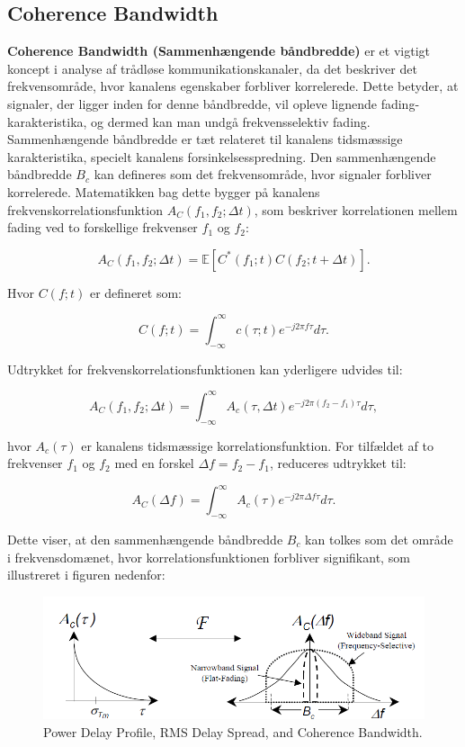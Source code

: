\documentclass[a4paper,12pt]{book}
\begin{document}
	\subsection{Coherence Bandwidth}
	\textbf{Coherence Bandwidth (Sammenhængende båndbredde)} er et vigtigt koncept i analyse af trådløse kommunikationskanaler, da det beskriver det frekvensområde, hvor kanalens egenskaber forbliver korrelerede. Dette betyder, at signaler, der ligger inden for denne båndbredde, vil opleve lignende fading-karakteristika, og dermed kan man undgå frekvensselektiv fading.
	\newline\newline
	Sammenhængende båndbredde er tæt relateret til kanalens tidsmæssige karakteristika, specielt kanalens forsinkelsesspredning. Den sammenhængende båndbredde \( B_c \) kan defineres som det frekvensområde, hvor signaler forbliver korrelerede. Matematikken bag dette bygger på kanalens frekvenskorrelationsfunktion \( A_C(f_1, f_2; \Delta t) \), som beskriver korrelationen mellem fading ved to forskellige frekvenser \( f_1 \) og \( f_2 \):
	
	\[
	A_C(f_1, f_2; \Delta t) = \mathbb{E}[C^*(f_1; t) C(f_2; t + \Delta t)].
	\]
	
	Hvor \( C(f; t) \) er defineret som:
	
	\[
	C(f; t) = \int_{-\infty}^{\infty} c(\tau; t) e^{-j 2 \pi f \tau} d\tau.
	\]
	
	Udtrykket for frekvenskorrelationsfunktionen kan yderligere udvides til:
	
	\[
	A_C(f_1, f_2; \Delta t) = \int_{-\infty}^{\infty} A_c(\tau, \Delta t) e^{-j 2 \pi (f_2 - f_1) \tau} d\tau,
	\]
	
	hvor \( A_c(\tau) \) er kanalens tidsmæssige korrelationsfunktion. For tilfældet af to frekvenser \( f_1 \) og \( f_2 \) med en forskel \( \Delta f = f_2 - f_1 \), reduceres udtrykket til:
	
	\[
	A_C(\Delta f) = \int_{-\infty}^{\infty} A_c(\tau) e^{-j 2 \pi \Delta f \tau} d\tau.
	\]
	
	Dette viser, at den sammenhængende båndbredde \( B_c \) kan tolkes som det område i frekvensdomænet, hvor korrelationsfunktionen forbliver signifikant, som illustreret i figuren nedenfor:
	
	\begin{figure}[!h]
		\centering\includegraphics[width=\textwidth]{fig/fig28.png}
		\caption{Power Delay Profile, RMS Delay Spread, and Coherence Bandwidth.}
	\end{figure}
	
\end{document}
